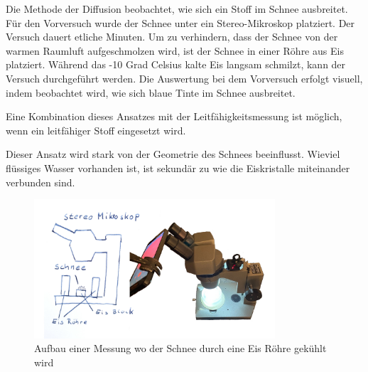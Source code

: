 Die Methode der Diffusion beobachtet, wie sich ein Stoff im Schnee ausbreitet. Für den Vorversuch wurde der Schnee unter ein Stereo-Mikroskop platziert. Der Versuch dauert etliche Minuten. Um zu verhindern, dass der Schnee von der warmen Raumluft aufgeschmolzen wird, ist der Schnee in einer Röhre aus Eis platziert. Während das -10 Grad Celsius kalte Eis langsam schmilzt, kann der Versuch durchgeführt werden. Die Auswertung bei dem Vorversuch erfolgt visuell, indem beobachtet wird, wie sich blaue Tinte im Schnee ausbreitet.

Eine Kombination dieses Ansatzes mit der Leitfähigkeitsmessung ist möglich, wenn ein leitfähiger Stoff eingesetzt wird.

Dieser Ansatz wird stark von der Geometrie des Schnees beeinflusst. Wieviel flüssiges Wasser vorhanden ist, ist sekundär zu wie die Eiskristalle miteinander verbunden sind.

\begin{figure}[H]
    \centering
    \includegraphics[width=0.8\textwidth]{Bilder/freistellen.jpeg}
    \caption{Aufbau einer Messung wo der Schnee durch eine Eis Röhre gekühlt wird}
    \label{fig:AutMess}
\end{figure}
